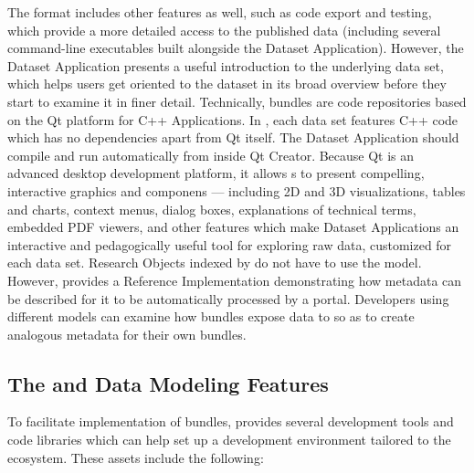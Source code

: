 \documentclass[10pt,letterpaper]{article}
\begin{document}
\p{}
The {\RAK} format includes other 
features as well, such as code export and testing, 
which provide a more detailed access to 
the published data (including several command-line 
executables built alongside the Dataset Application).  
However, the Dataset Application 
presents a useful introduction to the underlying 
data set, which helps users get oriented to the dataset 
in its broad overview before they start to examine it in 
finer detail.
\p{}
Technically, {\MOSAIC} {\RAK} bundles are code repositories 
based on the Qt platform for C++ Applications.  
In {\RAK}, each data set features C++ code which has no 
dependencies apart from Qt itself.  The Dataset 
Application should compile and run automatically from 
inside Qt Creator.  Because Qt is an advanced 
desktop {\GUI} development platform, it allows 
{\RO}s to present compelling, 
interactive graphics and {\GUI} componens 
--- including 2D and 3D visualizations, tables and charts, 
context menus, dialog boxes, explanations of 
technical terms, embedded PDF viewers, and other 
features which make Dataset Applications an 
interactive and pedagogically useful tool for 
exploring raw data, customized for each data set.
\p{}  
Research Objects indexed by {\MOSAIC} do not have to 
use the {\RAK} model.  However, {\RAK} provides a 
Reference Implementation demonstrating how {\RO} 
metadata can be described for it to be automatically 
processed by a {\MOSAIC} portal.  Developers 
using different {\RO} models can 
examine how {\RAK} bundles expose data to {\MOSAIC} 
so as to create analogous metadata for their own 
bundles.
\p{}
\subsection{The {\lMOSAIC} {\SDK} and Data Modeling Features}
To facilitate implementation of {\RAK} bundles, 
{\MOSAIC} provides several development tools and 
code libraries which can help set up a development 
environment tailored to the {\MOSAIC} ecosystem.  
These assets include the following: 
\end{document}
